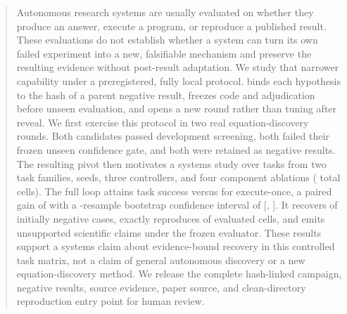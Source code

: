 \begin{abstract}
Autonomous research systems are usually evaluated on whether they produce an
answer, execute a program, or reproduce a published result. These evaluations
do not establish whether a system can turn its own failed experiment into a
new, falsifiable mechanism and preserve the resulting evidence without
post-result adaptation. We study that narrower capability under a
preregistered, fully local protocol. \method{} binds each hypothesis to the
hash of a parent negative result, freezes code and adjudication before unseen
evaluation, and opens a new round rather than tuning after reveal. We first
exercise this protocol in two real equation-discovery rounds. Both candidates
passed development screening, both failed their frozen unseen confidence
gate, and both were retained as negative results. The resulting pivot then
motivates a systems study over \TaskCount{} tasks from two task families,
\SeedCount{} seeds, three controllers, and four component ablations
(\CellCount{} total cells). The full loop attains task success
\FullLoopSuccess{} versus \ExecuteOnceSuccess{} for execute-once, a paired
gain of \PairedGain{} with a \BootstrapResamples{}-resample bootstrap
confidence interval of [\PairedCILower{}, \PairedCIUpper{}]. It recovers
\FullLoopRecovery{} of initially negative cases, exactly reproduces
\FullLoopReproduction{} of evaluated cells, and emits \FullLoopUnsupported{}
unsupported scientific claims under the frozen evaluator. These results
support a systems claim about evidence-bound recovery in this controlled
task matrix, not a claim of general autonomous discovery or a new
equation-discovery method. We release the complete hash-linked campaign,
negative results, source evidence, paper source, and clean-directory
reproduction entry point for human review.
\end{abstract}
